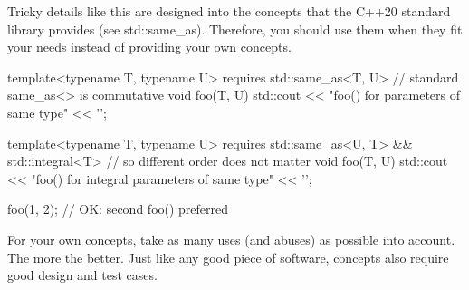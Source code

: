 Tricky details like this are designed into the concepts that the C++20 standard library provides (see std::same\_as). Therefore, you should use them when they fit your needs instead of providing your own concepts.

\begin{cpp}
template<typename T, typename U>
requires std::same_as<T, U> // standard same_as<> is commutative
void foo(T, U)
{
	std::cout << "foo() for parameters of same type" << '\n';
}

template<typename T, typename U>
requires std::same_as<U, T> && std::integral<T> // so different order does not matter
void foo(T, U)
{
	std::cout << "foo() for integral parameters of same type" << '\n';
}

foo(1, 2); // OK: second foo() preferred
\end{cpp}

For your own concepts, take as many uses (and abuses) as possible into account. The more the better. Just like any good piece of software, concepts also require good design and test cases.












